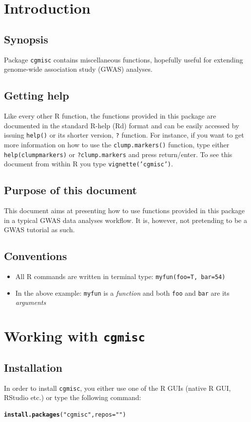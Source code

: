 \documentclass{article}\usepackage{graphicx, color}
\makeatletter
\newcommand{\hlfunctioncall}[1]{\textcolor[rgb]{0.501960784313725,0,0.329411764705882}{\textbf{#1}}}%
\newcommand{\hlstring}[1]{\textcolor[rgb]{0.6,0.6,1}{#1}}%
\newenvironment{kframe}{%
 \def\at@end@of@kframe{}%
 \ifinner\ifhmode%
  \def\at@end@of@kframe{\end{minipage}}%
  \begin{minipage}{\columnwidth}%
 \fi\fi%
 \def\FrameCommand##1{\hskip\@totalleftmargin \hskip-\fboxsep
 \colorbox{shadecolor}{##1}\hskip-\fboxsep
     \hskip-\linewidth \hskip-\@totalleftmargin \hskip\columnwidth}%
 \MakeFramed {\advance\hsize-\width
   \@totalleftmargin\z@ \linewidth\hsize
   \@setminipage}}%
 {\par\unskip\endMakeFramed%
 \at@end@of@kframe}
\newenvironment{knitrout}{}{} %
\makeatother
\begin{document}
\section{Introduction}
\subsection{Synopsis}
Package {\tt cgmisc} contains miscellaneous functions, hopefully useful for extending genome-wide association study (GWAS) analyses. 

\subsection{Getting help}
Like every other R function, the functions provided in this package are documented in the standard R-help (Rd) format and can be easily accessed by issuing {\tt help()} or its shorter version, {\tt ?} function. For instance, if you want to get more information on how to use the {\tt clump.markers()} function, type either {\tt help(clumpmarkers)} or {\tt ?clump.markers} and press return/enter. To see this document from within R you type {\tt vignette('cgmisc')}. 

\subsection{Purpose of this document}
This document aims at presenting how to use functions provided in this package in a typical GWAS data analyses workflow. It is, however, not pretending to be a GWAS tutorial as such.

\subsection{Conventions}
\begin{itemize}
  \item{All R commands are written in terminal type: {\tt myfun(foo=T, bar=54)}}
  \item{In the above example: {\tt myfun} is a \textit{function} and both {\tt foo} and {\tt bar} are its \textit{arguments}}
\end{itemize}

\section{Working with {\tt cgmisc}}
\subsection{Installation}
In order to install {\tt cgmisc}, you either use one of the R GUIs (native R GUI, RStudio etc.) or type the following command:
\begin{knitrout}
\color{fgcolor}\begin{kframe}
\begin{alltt}
\hlfunctioncall{install.packages}(\hlstring{"cgmisc"}, repos = \hlstring{""})
\end{alltt}
\end{kframe}
\end{knitrout}
\end{document}
